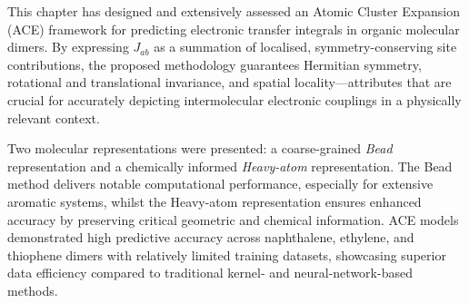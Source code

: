 

This chapter has designed and extensively assessed an Atomic Cluster Expansion (ACE) framework for predicting electronic transfer integrals in organic molecular dimers. By expressing \( J_{ab} \) as a summation of localised, symmetry-conserving site contributions, the proposed methodology guarantees Hermitian symmetry, rotational and translational invariance, and spatial locality—attributes that are crucial for accurately depicting intermolecular electronic couplings in a physically relevant context.

 Two molecular representations were presented: a coarse-grained \textit{Bead} representation and a chemically informed \textit{Heavy-atom} representation.  The Bead method delivers notable computational performance, especially for extensive aromatic systems, whilst the Heavy-atom representation ensures enhanced accuracy by preserving critical geometric and chemical information.  ACE models demonstrated high predictive accuracy across naphthalene, ethylene, and thiophene dimers with relatively limited training datasets, showcasing superior data efficiency compared to traditional kernel- and neural-network-based methods.

